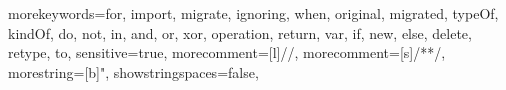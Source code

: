 {morekeywords={for, import, migrate, ignoring, when, original, migrated, typeOf, kindOf, do, not, in, and, or, xor, operation, return, var, if, new, else, delete, retype, to},
sensitive=true,
morecomment=[l]{//},
morecomment=[s]{/*}{*/},
morestring=[b]",
showstringspaces=false,
}